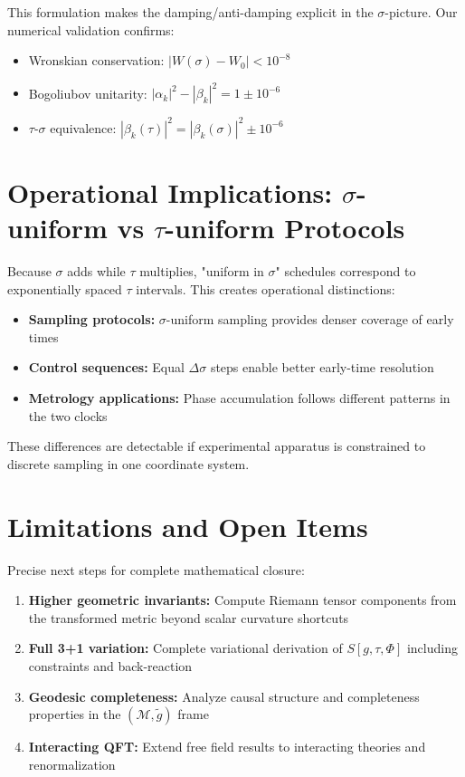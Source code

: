 \documentclass[11pt]{article}
\begin{document}
This formulation makes the damping/anti-damping explicit in the $\sigma$-picture. Our numerical validation confirms:
\begin{itemize}
\item Wronskian conservation: $|W(\sigma) - W_0| < 10^{-8}$
\item Bogoliubov unitarity: $|\alpha_k|^2 - |\beta_k|^2 = 1 \pm 10^{-6}$
\item $\tau$-$\sigma$ equivalence: $|\beta_k(\tau)|^2 = |\beta_k(\sigma)|^2 \pm 10^{-6}$
\end{itemize}

\section{Operational Implications: $\sigma$-uniform vs $\tau$-uniform Protocols}

Because $\sigma$ adds while $\tau$ multiplies, "uniform in $\sigma$" schedules correspond to exponentially spaced $\tau$ intervals. This creates operational distinctions:

\begin{itemize}
\item \textbf{Sampling protocols:} $\sigma$-uniform sampling provides denser coverage of early times
\item \textbf{Control sequences:} Equal $\Delta\sigma$ steps enable better early-time resolution
\item \textbf{Metrology applications:} Phase accumulation follows different patterns in the two clocks
\end{itemize}

These differences are detectable if experimental apparatus is constrained to discrete sampling in one coordinate system.

\section{Limitations and Open Items}

Precise next steps for complete mathematical closure:
\begin{enumerate}
\item \textbf{Higher geometric invariants:} Compute Riemann tensor components from the transformed metric beyond scalar curvature shortcuts
\item \textbf{Full 3+1 variation:} Complete variational derivation of $S[g,\tau,\Phi]$ including constraints and back-reaction
\item \textbf{Geodesic completeness:} Analyze causal structure and completeness properties in the $(\mathcal{M}, \tilde{g})$ frame
\item \textbf{Interacting QFT:} Extend free field results to interacting theories and renormalization
\end{enumerate}
\end{document}
